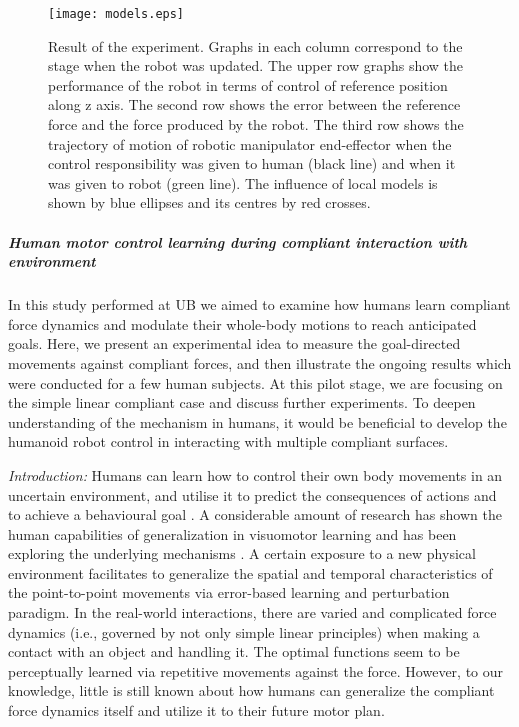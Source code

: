 \begin{figure}[!t]
	\centering
	\texttt{[image: models.eps]}
	\caption{Result of the experiment. Graphs in each column correspond to the stage when the robot was updated. The upper row graphs show the performance of the robot in terms of control of reference position along z axis. The second row shows the error between the reference force and the force produced by the robot. The third row shows the trajectory of motion of robotic manipulator end-effector when the control responsibility was given to human (black line) and when it was given to robot (green line). The influence of local models is shown by blue ellipses and its centres by red crosses.}
	\label{fig:models}
\end{figure}





\subparagraph*{Human motor control learning during compliant interaction with environment}

In this study performed at UB we aimed to examine how humans learn compliant force dynamics and modulate their whole-body motions to reach anticipated goals. Here, we present an experimental idea to measure the goal-directed movements against compliant forces, and then illustrate the ongoing results which were conducted for a few human subjects. At this pilot stage, we are focusing on the simple linear compliant case and discuss further experiments. To deepen understanding of the mechanism in humans, it would be beneficial to develop the humanoid robot control in interacting with multiple compliant surfaces.


\textit{Introduction:} Humans can learn how to control their own body movements in an uncertain environment, and utilise it to predict the consequences of actions and to achieve a behavioural goal \cite{Wolpert11, Davidson&Wolpert03}. A considerable amount of research has shown the human capabilities of generalization in visuomotor learning and has been exploring the underlying mechanisms \cite{Goodbody&Wolpert98, Krakauer06}. A certain exposure to a new physical environment facilitates to generalize the spatial and temporal characteristics of the point-to-point movements via error-based learning and perturbation paradigm. In the real-world interactions, there are varied and complicated force dynamics (i.e., governed by not only simple linear principles) when making a contact with an object and handling it. The optimal functions seem to be perceptually learned via repetitive movements against the force. However, to our knowledge, little is still known about how humans can generalize the compliant force dynamics itself and utilize it to their future motor plan.

